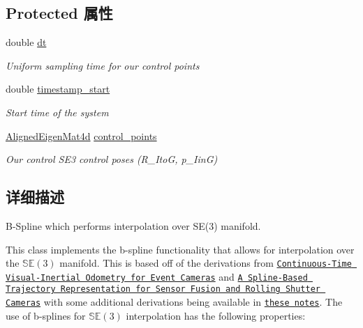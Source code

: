\subsection*{Protected 属性}
\begin{DoxyCompactItemize}
\item 
\mbox{\label{classov__core_1_1BsplineSE3_a48e22f59195971f19e93f27a9dd9f250}} 
double \hyperlink{classov__core_1_1BsplineSE3_a48e22f59195971f19e93f27a9dd9f250}{dt}
\begin{DoxyCompactList}\small\item\em Uniform sampling time for our control points \end{DoxyCompactList}\item 
\mbox{\label{classov__core_1_1BsplineSE3_a3918570c18a61486c049a910c501d85a}} 
double \hyperlink{classov__core_1_1BsplineSE3_a3918570c18a61486c049a910c501d85a}{timestamp\+\_\+start}
\begin{DoxyCompactList}\small\item\em Start time of the system \end{DoxyCompactList}\item 
\mbox{\label{classov__core_1_1BsplineSE3_a339afd2119785871db41799c3c5e2ec0}} 
\hyperlink{classov__core_1_1BsplineSE3_a2e0b3cb7cef84db7b84598f2ea01e00d}{Aligned\+Eigen\+Mat4d} \hyperlink{classov__core_1_1BsplineSE3_a339afd2119785871db41799c3c5e2ec0}{control\+\_\+points}
\begin{DoxyCompactList}\small\item\em Our control S\+E3 control poses (R\+\_\+\+ItoG, p\+\_\+\+IinG) \end{DoxyCompactList}\end{DoxyCompactItemize}


\subsection{详细描述}
B-\/\+Spline which performs interpolation over S\+E(3) manifold. 

This class implements the b-\/spline functionality that allows for interpolation over the $\mathbb{SE}(3)$ manifold. This is based off of the derivations from \href{https://ieeexplore.ieee.org/abstract/document/8432102/}{\tt Continuous-\/\+Time Visual-\/\+Inertial Odometry for Event Cameras} and \href{https://link.springer.com/article/10.1007/s11263-015-0811-3}{\tt A Spline-\/\+Based Trajectory Representation for Sensor Fusion and Rolling Shutter Cameras} with some additional derivations being available in \href{http://udel.edu/~pgeneva/downloads/notes/2018_notes_mueffler2017arxiv.pdf}{\tt these notes}. The use of b-\/splines for $\mathbb{SE}(3)$ interpolation has the following properties\+:


